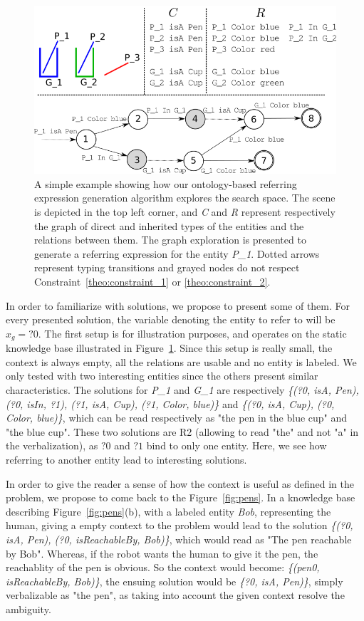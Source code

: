 \documentclass[a4paper,11pt,twoside]{StyleThese}
\begin{document}
\begin{figure}[hbtp]
\centering
\includegraphics[width=\textwidth]{figures/chapter3/search.png}
\caption{A simple example showing how our ontology-based referring expression generation algorithm explores the search space. The scene is depicted in the top left corner, and \textit{C} and \textit{R} represent respectively the graph of direct and inherited types of the entities and the relations between them. The graph exploration is presented to generate a referring expression for the entity \textit{P\_1}. Dotted arrows represent typing transitions and grayed nodes do not respect Constraint~\ref{theo:constraint_1} or \ref{theo:constraint_2}.}
\label{fig:search_example} 
\end{figure}

In order to familiarize with solutions, we propose to present some of them. For every presented solution, the variable denoting the entity to refer to will be $x_g = ?0$.
The first setup is for illustration purposes, and operates on the static knowledge base illustrated in Figure~\ref{fig:search_example}.
Since this setup is really small, the context is always empty, all the relations are usable and no entity is labeled.
We only tested with two interesting entities since the others present similar characteristics.
The solutions for \textit{P\_1} and \textit{G\_1} are respectively \textit{\{(?0, isA, Pen), (?0, isIn, ?1), (?1, isA, Cup), (?1, Color, blue)\}} and \textit{\{(?0, isA, Cup), (?0, Color, blue)\}}, which can be read respectively as "the pen in the blue cup" and "the blue cup". These two solutions are R2 (allowing to read "the" and not "a" in the verbalization), as $?0$ and $?1$ bind to only one entity. Here, we see how referring to another entity lead to interesting solutions.

In order to give the reader a sense of how the context is useful as defined in the problem, we propose to come back to the Figure~\ref{fig:pens}.
In a knowledge base describing Figure~\ref{fig:pens}(b), with a labeled entity \textit{Bob}, representing the human, giving a empty context to the problem would lead to the solution \textit{\{(?0, isA, Pen), (?0, isReachableBy, Bob)\}}, which would read as "The pen reachable by Bob". Whereas, if the robot wants the human to give it the pen, the reachablity of the pen is obvious. So the context would become: \textit{\{(pen0, isReachableBy, Bob)\}}, the ensuing solution would be \textit{\{?0, isA, Pen)\}}, simply verbalizable as "the pen", as taking into account the given context resolve the ambiguity.
\end{document}

